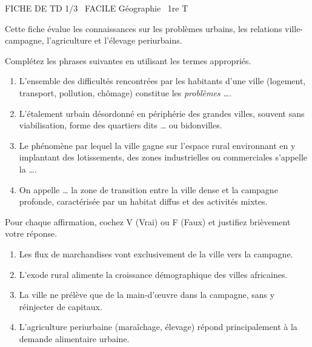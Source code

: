 \documentclass[11pt]{article}
\begin{document}
\begin{tcolorbox}[enhanced,colback=popink,colframe=popink,arc=10pt,boxrule=0pt,left=12pt,right=12pt,top=9pt,bottom=9pt]
{\color{white}\popxbold\small FICHE DE TD 1/3 \textbullet\ FACILE \hfill Géographie \textbullet\ 1re T\par}
\end{tcolorbox}
\vspace{4pt}
Cette fiche évalue les connaissances sur les problèmes urbains, les relations ville-campagne, l'agriculture et l'élevage periurbains.

\begin{exercice}
Complétez les phrases suivantes en utilisant les termes appropriés.
\begin{enumerate}
    \item L'ensemble des difficultés rencontrées par les habitants d'une ville (logement, transport, pollution, chômage) constitue les \textit{problèmes \dots}.
    \item L'étalement urbain désordonné en périphérie des grandes villes, souvent sans viabilisation, forme des quartiers dits \textit{\dots} ou bidonvilles.
    \item Le phénomène par lequel la ville gagne sur l'espace rural environnant en y implantant des lotissements, des zones industrielles ou commerciales s'appelle la \textit{\dots}.
    \item On appelle \textit{\dots} la zone de transition entre la ville dense et la campagne profonde, caractérisée par un habitat diffus et des activités mixtes.
\end{enumerate}
\end{exercice}

\begin{exercice}
Pour chaque affirmation, cochez V (Vrai) ou F (Faux) et justifiez brièvement votre réponse.
\begin{enumerate}
    \item Les flux de marchandises vont exclusivement de la ville vers la campagne.
    \item L'exode rural alimente la croissance démographique des villes africaines.
    \item La ville ne prélève que de la main-d'œuvre dans la campagne, sans y réinjecter de capitaux.
    \item L'agriculture periurbaine (maraîchage, élevage) répond principalement à la demande alimentaire urbaine.
\end{enumerate}
\end{exercice}
\end{document}

